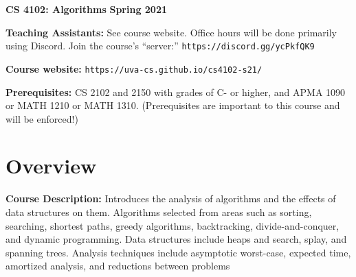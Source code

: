 \documentclass[12pt]{article}
\begin{document}
\textbf{\Large CS 4102: Algorithms} \hfill \textbf{\Large Spring 2021}

\vskip 0.5in 


\vskip 0.1in
\textbf{Teaching Assistants:} See course website.  Office hours will be done primarily using Discord. Join the course's ``server:''  {\tt https://discord.gg/ycPkfQK9}

\vskip 0.1in
\textbf{Course website:} {\tt https://uva-cs.github.io/cs4102-s21/}

\textbf{Prerequisites:} CS 2102 and 2150 with grades of C- or higher, and APMA 1090 or MATH 1210 or MATH 1310. (Prerequisites are important to this course and will be enforced!)

\section*{Overview}

\textbf{Course Description:} Introduces the analysis of algorithms and the effects of data structures on them. Algorithms selected from areas such as sorting, searching, shortest paths, greedy algorithms, backtracking, divide-and-conquer, and dynamic programming. Data structures include heaps and search, splay, and spanning trees. Analysis techniques include asymptotic worst-case, expected time, amortized analysis, and reductions between problems
\end{document}
